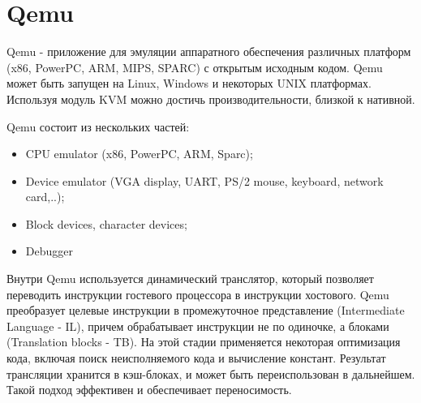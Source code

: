 \section{Qemu}
Qemu - приложение для эмуляции аппаратного обеспечения различных платформ (x86, PowerPC, ARM, MIPS, SPARC) с открытым исходным кодом. Qemu может быть запущен на Linux, Windows и некоторых UNIX платформах. Используя модуль KVM можно достичь производительности, близкой к нативной.

Qemu состоит из нескольких частей:
\begin{itemize}
    \item CPU emulator (x86, PowerPC, ARM, Sparc);
    \item Device emulator (VGA display, UART, PS/2 mouse, keyboard, network card,..);
    \item Block devices, character devices;
    \item Debugger
\end{itemize} 

Внутри Qemu используется динамический транслятор, который позволяет переводить инструкции гостевого процессора в инструкции хостового. Qemu преобразует целевые инструкции в промежуточное представление (Intermediate Language - IL), причем обрабатывает инструкции не по одиночке, а блоками (Translation blocks - TB). На этой стадии применяется некоторая оптимизация кода, включая поиск неисполняемого кода и вычисление констант. Результат трансляции хранится в кэш-блоках, и может быть переиспользован в дальнейшем. Такой подход эффективен и обеспечивает переносимость.





